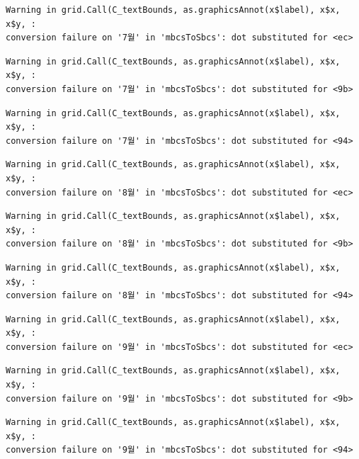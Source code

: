 \documentclass[
  letterpaper,
  DIV=11,
  numbers=noendperiod]{scrreprt}
\begin{document}
\begin{verbatim}
Warning in grid.Call(C_textBounds, as.graphicsAnnot(x$label), x$x, x$y, :
conversion failure on '7월' in 'mbcsToSbcs': dot substituted for <ec>
\end{verbatim}

\begin{verbatim}
Warning in grid.Call(C_textBounds, as.graphicsAnnot(x$label), x$x, x$y, :
conversion failure on '7월' in 'mbcsToSbcs': dot substituted for <9b>
\end{verbatim}

\begin{verbatim}
Warning in grid.Call(C_textBounds, as.graphicsAnnot(x$label), x$x, x$y, :
conversion failure on '7월' in 'mbcsToSbcs': dot substituted for <94>
\end{verbatim}

\begin{verbatim}
Warning in grid.Call(C_textBounds, as.graphicsAnnot(x$label), x$x, x$y, :
conversion failure on '8월' in 'mbcsToSbcs': dot substituted for <ec>
\end{verbatim}

\begin{verbatim}
Warning in grid.Call(C_textBounds, as.graphicsAnnot(x$label), x$x, x$y, :
conversion failure on '8월' in 'mbcsToSbcs': dot substituted for <9b>
\end{verbatim}

\begin{verbatim}
Warning in grid.Call(C_textBounds, as.graphicsAnnot(x$label), x$x, x$y, :
conversion failure on '8월' in 'mbcsToSbcs': dot substituted for <94>
\end{verbatim}

\begin{verbatim}
Warning in grid.Call(C_textBounds, as.graphicsAnnot(x$label), x$x, x$y, :
conversion failure on '9월' in 'mbcsToSbcs': dot substituted for <ec>
\end{verbatim}

\begin{verbatim}
Warning in grid.Call(C_textBounds, as.graphicsAnnot(x$label), x$x, x$y, :
conversion failure on '9월' in 'mbcsToSbcs': dot substituted for <9b>
\end{verbatim}

\begin{verbatim}
Warning in grid.Call(C_textBounds, as.graphicsAnnot(x$label), x$x, x$y, :
conversion failure on '9월' in 'mbcsToSbcs': dot substituted for <94>
\end{verbatim}
\end{document}
